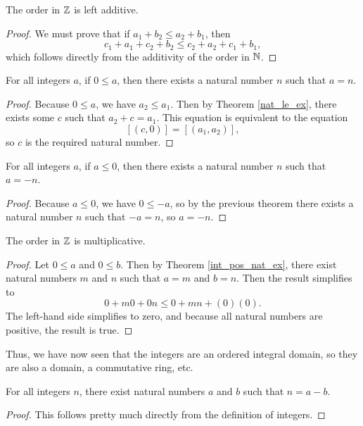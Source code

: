 \documentclass[../../math.tex]{subfiles}
\begin{document}
\begin{instance}
    The order in $\mathbb{Z}$ is left additive.
\end{instance}
\begin{proof}
    We must prove that if $a_1 + b_2 \leq a_2 + b_1$, then
    \[
        c_1 + a_1 + c_2 + b_2 \leq c_2 + a_2 + c_1 + b_1,
    \]
    which follows directly from the additivity of the order in $\mathbb{N}$.
\end{proof}

\begin{theorem} \label{int_pos_nat_ex}
    For all integers $a$, if $0 \leq a$, then there exists a natural number $n$
    such that $a = n$.
\end{theorem}
\begin{proof}
    Because $0 \leq a$, we have $a_2 \leq a_1$.  Then by Theorem
    \ref{nat_le_ex}, there exists some $c$ such that $a_2 + c = a_1$.  This
    equation is equivalent to the equation
    \[
        [(c, 0)] = [(a_1, a_2)],
    \]
    so $c$ is the required natural number.
\end{proof}

\begin{theorem} \label{int_neg_nat_ex}
    For all integers $a$, if $a \leq 0$, then there exists a natural number $n$
    such that $a = -n$.
\end{theorem}
\begin{proof}
    Because $a \leq 0$, we have $0 \leq -a$, so by the previous theorem there
    exists a natural number $n$ such that $-a = n$, so $a = -n$.
\end{proof}

\begin{instance}
    The order in $\mathbb{Z}$ is multiplicative.
\end{instance}
\begin{proof}
    Let $0 \leq a$ and $0 \leq b$.  Then by Theorem \ref{int_pos_nat_ex}, there
    exist natural numbers $m$ and $n$ such that $a = m$ and $b = n$.  Then the
    result simplifies to
    \[
        0 + m0 + 0n \leq 0 + mn + (0)(0).
    \]
    The left-hand side simplifies to zero, and because all natural numbers are
    positive, the result is true.
\end{proof}

Thus, we have now seen that the integers are an ordered integral domain, so they
are also a domain, a commutative ring, etc.

\begin{theorem} \label{int_nat_ex}
    For all integers $n$, there exist natural numbers $a$ and $b$ such that $n =
    a - b$.
\end{theorem}
\begin{proof}
    This follows pretty much directly from the definition of integers.
\end{proof}
\end{document}
